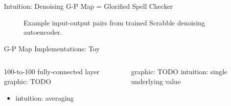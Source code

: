 \begin{frame}{Intuition: Denoising G-P Map = Glorified Spell Checker}

\begin{figure}

\centering \Huge


%
%
%
%


\vspace{1ex}

\caption{
Example input-output pairs from trained Scrabble denoising autoencoder.
}

\end{figure}

\end{frame}

\begin{frame}{G-P Map Implementations: Toy}

\begin{columns}
\begin{column}{0.5\textwidth}
100-to-100 fully-connected layer
graphic: TODO
\begin{itemize}
\item intuition: averaging
\end{itemize}
\end{column}
\begin{column}{0.5\textwidth}
graphic: TODO
intuition: single underlying value
\end{column}
\end{columns}

\end{frame}
